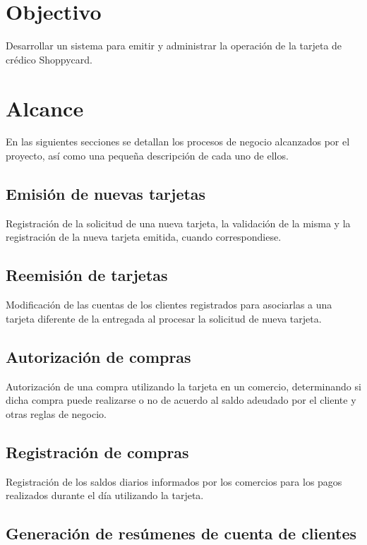 \section{Objectivo}

Desarrollar un sistema para emitir y administrar la operación de la tarjeta de crédico Shoppycard.


\section{Alcance}

En las siguientes secciones se detallan los procesos de negocio alcanzados por el proyecto, así como una pequeña descripción de cada uno de ellos.

\subsection{Emisión de nuevas tarjetas}

Registración de la solicitud de una nueva tarjeta, la validación de la misma y la registración de la nueva tarjeta emitida, cuando correspondiese.

\subsection{Reemisión de tarjetas}

Modificación de las cuentas de los clientes registrados para asociarlas a una tarjeta diferente de la entregada al procesar la solicitud de nueva tarjeta.

\subsection{Autorización de compras}

Autorización de una compra utilizando la tarjeta en un comercio, determinando si dicha compra puede realizarse o no de acuerdo al saldo adeudado por el cliente y otras reglas de negocio.

\subsection{Registración de compras}

Registración de los saldos diarios informados por los comercios para los pagos realizados durante el día utilizando la tarjeta.

\subsection{Generación de resúmenes de cuenta de clientes}

